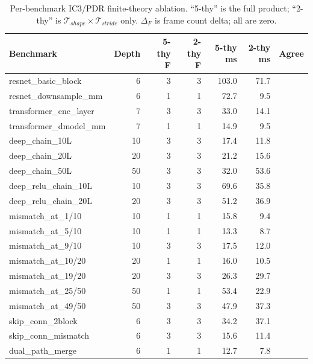 \documentclass[11pt]{article}
\newcommand{\cmark}{\ding{51}}
\begin{document}
\begin{table}[h]
\centering
\caption{Per-benchmark IC3/PDR finite-theory ablation.  ``5-thy'' is the
  full product; ``2-thy'' is $\mathcal{T}_{\mathit{shape}} \times
  \mathcal{T}_{\mathit{stride}}$ only.  $\Delta_F$ is frame count delta;
  all are zero.}
\label{tab:ic3-ablation-full}
\small
\begin{tabular}{@{}lrrrrrc@{}}
\toprule
\textbf{Benchmark} & \textbf{Depth} &
  \textbf{5-thy F} & \textbf{2-thy F} & \textbf{5-thy ms} & \textbf{2-thy ms} &
  \textbf{Agree} \\
\midrule
resnet\_basic\_block        & 6  & 3 & 3 & 103.0 & 71.7 & \cmark \\
resnet\_downsample\_mm      & 6  & 1 & 1 &  72.7 &  9.5 & \cmark \\
transformer\_enc\_layer     & 7  & 3 & 3 &  33.0 & 14.1 & \cmark \\
transformer\_dmodel\_mm     & 7  & 1 & 1 &  14.9 &  9.5 & \cmark \\
deep\_chain\_10L            & 10 & 3 & 3 &  17.4 & 11.8 & \cmark \\
deep\_chain\_20L            & 20 & 3 & 3 &  21.2 & 15.6 & \cmark \\
deep\_chain\_50L            & 50 & 3 & 3 &  32.0 & 53.6 & \cmark \\
deep\_relu\_chain\_10L      & 10 & 3 & 3 &  69.6 & 35.8 & \cmark \\
deep\_relu\_chain\_20L      & 20 & 3 & 3 &  51.2 & 36.9 & \cmark \\
mismatch\_at\_1/10          & 10 & 1 & 1 &  15.8 &  9.4 & \cmark \\
mismatch\_at\_5/10          & 10 & 1 & 1 &  13.3 &  8.7 & \cmark \\
mismatch\_at\_9/10          & 10 & 3 & 3 &  17.5 & 12.0 & \cmark \\
mismatch\_at\_10/20         & 20 & 1 & 1 &  16.0 & 10.5 & \cmark \\
mismatch\_at\_19/20         & 20 & 3 & 3 &  26.3 & 29.7 & \cmark \\
mismatch\_at\_25/50         & 50 & 1 & 1 &  53.4 & 22.9 & \cmark \\
mismatch\_at\_49/50         & 50 & 3 & 3 &  47.9 & 37.3 & \cmark \\
skip\_conn\_2block          & 6  & 3 & 3 &  34.2 & 37.1 & \cmark \\
skip\_conn\_mismatch        & 6  & 3 & 3 &  15.6 & 11.4 & \cmark \\
dual\_path\_merge           & 6  & 1 & 1 &  12.7 &  7.8 & \cmark \\

\end{tabular}
\end{table}
\end{document}
